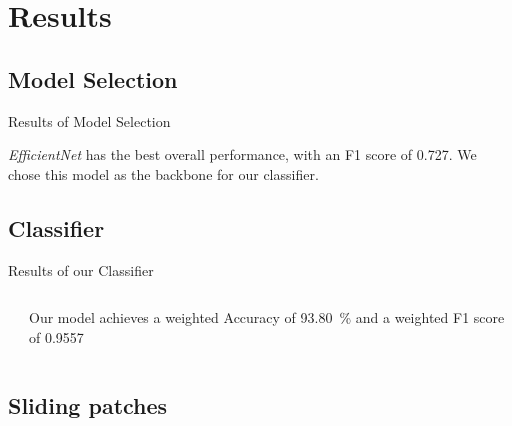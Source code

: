 \section{Results}
\subsection{Model Selection}

\begin{frame}{Results of Model Selection}
    

    \emph{EfficientNet} has the best overall performance, with an F1 score of \num{0.727}. We chose this model as the backbone for our classifier.
\end{frame}

\subsection{Classifier}
\begin{frame}{Results of our Classifier}
    \begin{columns}
        \begin{column}{0.65\textwidth}
            
        \end{column}
        \begin{column}{0.35\textwidth}
            Our model achieves a weighted Accuracy of \SI{93.80}{\percent} and a weighted F1 score of \num{0.9557}
        \end{column}
    \end{columns}
    
\end{frame}

\subsection{Sliding patches}
\begin{frame}
    
\end{frame}